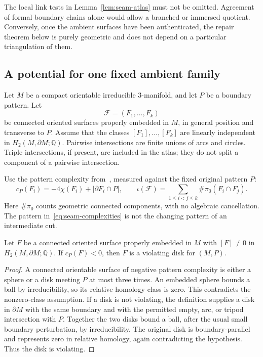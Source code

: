 The local link tests in Lemma~\ref{lem:seam-atlas} must not be omitted.
Agreement of formal boundary chains alone would allow a branched or
immersed quotient.  Conversely, once the ambient surfaces have been
authenticated, the repair theorem below is purely geometric and does not
depend on a particular triangulation of them.

\subsection{A potential for one fixed ambient family}

Let $M$ be a compact orientable irreducible $3$-manifold, and let $P$ be a
boundary pattern.  Let
\[
                         \mathcal F=(F_1,\ldots,F_k)
\]
be connected oriented surfaces properly embedded in $M$, in general
position and transverse to $P$.  Assume that the classes
$[F_1],\ldots,[F_k]$ are linearly independent in
$H_2(M,\partial M;\mathbb Q)$.  Pairwise intersections are finite unions
of arcs and circles.  Triple intersections, if present, are included in
the atlas; they do not split a component of a pairwise intersection.

Use the pattern complexity from~\cite[Section~3]{lackenby2026}, measured
against the fixed original pattern $P$:
\begin{equation}
 c_P(F_i)=-4\chi(F_i)+|\partial F_i\cap P|,
 \qquad
 \iota(\mathcal F)=
       \sum_{1\le i<j\le k}\#\pi_0(F_i\cap F_j).
 \label{eq:seam-complexities}
\end{equation}
Here $\#\pi_0$ counts geometric connected components, with no algebraic
cancellation.  The pattern in~\eqref{eq:seam-complexities} is not the
changing pattern of an intermediate cut.

\begin{lemma}
\label{lem:seam-negative}
Let $F$ be a connected oriented surface properly embedded in $M$ with
$[F]\ne0$ in $H_2(M,\partial M;\mathbb Q)$.  If $c_P(F)<0$, then $F$
is a violating disk for $(M,P)$.
\end{lemma}

\begin{proof}
A connected orientable surface of negative pattern complexity is either
a sphere or a disk meeting $P$ at most three times.  An embedded sphere
bounds a ball by irreducibility, so its relative homology class is zero.
This contradicts the nonzero-class assumption.  If a disk is not violating,
the definition supplies a disk in
$\partial M$ with the same boundary and with the permitted empty, arc, or
tripod intersection with $P$.  Together the two disks bound a ball, after
the usual small boundary perturbation, by irreducibility.  The original
disk is boundary-parallel and represents zero in relative homology,
again contradicting the hypothesis.  Thus the disk is violating.
\end{proof}

